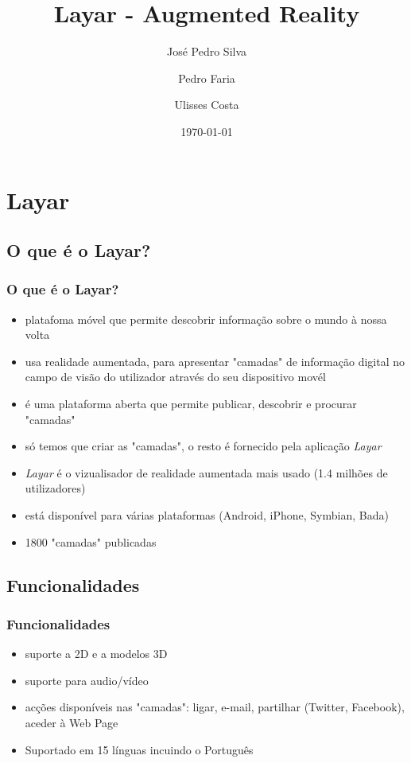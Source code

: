 \documentclass{beamer}
\title{Layar - Augmented Reality}
\author{José Pedro Silva \and
Pedro Faria \and
Ulisses Costa
}
\date{\today}
\institute{Engenharia de Linguagens\\
Processamento de Linguagem Natural
}
\begin{document}
\begin{frame}
   \titlepage
\end{frame}


\section{Layar}
\subsection{O que é o Layar?}
\begin{frame} \frametitle{O que é o Layar?}
\begin{itemize}
\pause \item platafoma móvel que permite descobrir informação sobre o mundo à nossa volta
\pause \item usa realidade aumentada, para apresentar "camadas" de informação digital no campo  de visão do utilizador através do seu dispositivo movél
\pause \item é uma plataforma aberta que permite publicar, descobrir e procurar "camadas"
\pause \item só temos que criar as "camadas", o resto é fornecido pela aplicação \textit{Layar}
\pause \item \textit{Layar} é o vizualisador de realidade aumentada mais usado (1.4 milhões de utilizadores)
\pause \item está disponível para várias plataformas (Android, iPhone, Symbian, Bada)
\pause \item 1800 "camadas" publicadas
\end{itemize}
\end{frame}

\subsection{Funcionalidades}
\begin{frame} \frametitle{Funcionalidades}
\begin{itemize}
\pause \item suporte a  2D e a modelos 3D
\pause \item suporte para audio/vídeo
\pause \item acções disponíveis nas "camadas": ligar, e-mail, partilhar (Twitter, Facebook), aceder à Web Page  
\pause \item Suportado em 15 línguas incuindo o Português
\end{itemize}
\end{frame}
\end{document}
